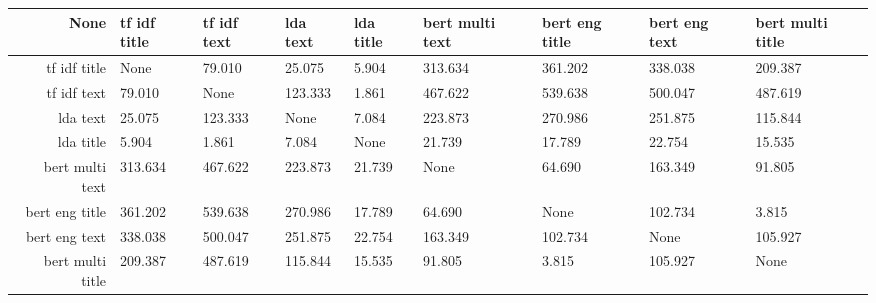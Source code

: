 \begin{tabular}{|r|l|l|l|l|l|l|l|l|}
  \hline
  None & tf idf title & tf idf text & lda text & lda title & bert multi text & bert eng title & bert eng text & bert multi title \\ 
  \hline
  tf idf title & None & 79.010 & 25.075 & 5.904 & 313.634 & 361.202 & 338.038 & 209.387 \\ 
  \hline
  tf idf text & 79.010 & None & 123.333 & 1.861 & 467.622 & 539.638 & 500.047 & 487.619 \\ 
  \hline
  lda text & 25.075 & 123.333 & None & 7.084 & 223.873 & 270.986 & 251.875 & 115.844 \\ 
  \hline
  lda title & 5.904 & 1.861 & 7.084 & None & 21.739 & 17.789 & 22.754 & 15.535 \\ 
  \hline
  bert multi text & 313.634 & 467.622 & 223.873 & 21.739 & None & 64.690 & 163.349 & 91.805 \\ 
  \hline
  bert eng title & 361.202 & 539.638 & 270.986 & 17.789 & 64.690 & None & 102.734 & 3.815 \\ 
  \hline
  bert eng text & 338.038 & 500.047 & 251.875 & 22.754 & 163.349 & 102.734 & None & 105.927 \\ 
  \hline
  bert multi title & 209.387 & 487.619 & 115.844 & 15.535 & 91.805 & 3.815 & 105.927 & None \\ 
  \hline
\end{tabular}
